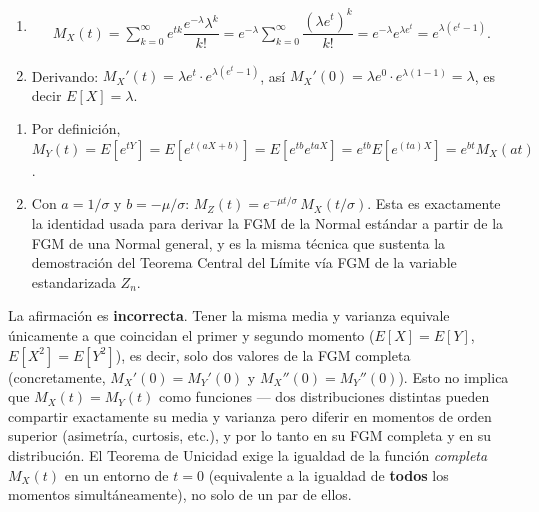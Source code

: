 \begin{solproblema}[prob:2c4cd93]
	\begin{enumerate}
		\item
		\begin{align*}
			M_X(t) = \sum_{k=0}^{\infty} e^{tk}\dfrac{e^{-\lambda}\lambda^k}{k!} = e^{-\lambda}\sum_{k=0}^{\infty}\dfrac{(\lambda e^t)^k}{k!} = e^{-\lambda}e^{\lambda e^t} = e^{\lambda(e^t-1)}.
		\end{align*}
		\item Derivando: $M_X'(t) = \lambda e^t \cdot e^{\lambda(e^t-1)}$, así $M_X'(0) = \lambda e^0 \cdot e^{\lambda(1-1)} = \lambda$, es decir $E[X]=\lambda$.
	\end{enumerate}
\end{solproblema}

\begin{solproblema}[prob:cf5e60c]
	\begin{enumerate}
		\item Por definición, $M_Y(t) = E[e^{tY}] = E[e^{t(aX+b)}] = E[e^{tb}e^{taX}] = e^{tb}E[e^{(ta)X}] = e^{bt}M_X(at)$.
		\item Con $a=1/\sigma$ y $b=-\mu/\sigma$: $M_Z(t) = e^{-\mu t/\sigma}\,M_X(t/\sigma)$. Esta es exactamente la identidad usada para derivar la FGM de la Normal estándar a partir de la FGM de una Normal general, y es la misma técnica que sustenta la demostración del Teorema Central del Límite vía FGM de la variable estandarizada $Z_n$.
	\end{enumerate}
\end{solproblema}

\begin{solproblema}[prob:5098ae4]
	La afirmación es \textbf{incorrecta}. Tener la misma media y varianza equivale únicamente a que coincidan el primer y segundo momento ($E[X]=E[Y]$, $E[X^2]=E[Y^2]$), es decir, solo dos valores de la FGM completa (concretamente, $M_X'(0)=M_Y'(0)$ y $M_X''(0)=M_Y''(0)$). Esto no implica que $M_X(t)=M_Y(t)$ como funciones — dos distribuciones distintas pueden compartir exactamente su media y varianza pero diferir en momentos de orden superior (asimetría, curtosis, etc.), y por lo tanto en su FGM completa y en su distribución. El Teorema de Unicidad exige la igualdad de la función \emph{completa} $M_X(t)$ en un entorno de $t=0$ (equivalente a la igualdad de \textbf{todos} los momentos simultáneamente), no solo de un par de ellos.
\end{solproblema}

